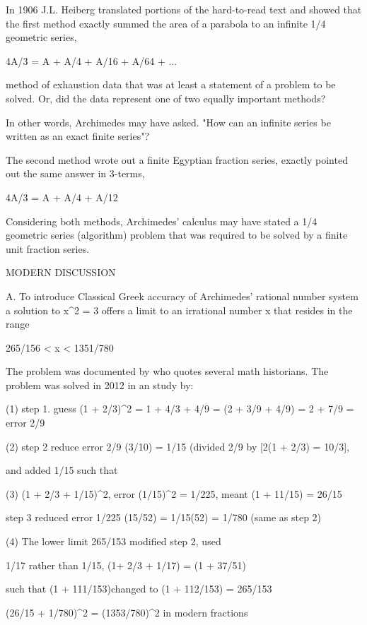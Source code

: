 \documentclass[12pt]{article}
\begin{document}
In 1906 J.L. Heiberg translated portions of the hard-to-read text and showed that the first method exactly summed the area of a parabola to an infinite 1/4 geometric series,

4A/3 = A + A/4 + A/16 + A/64 + ...

method of exhaustion data that was at least a statement of a problem to be solved.  Or, did the data represent one of two equally important methods? 

In other words, Archimedes may have asked. "How can an infinite series be written as an exact finite series"?

The second method wrote out a finite Egyptian fraction series, exactly pointed out the same answer in 3-terms,

4A/3 = A + A/4 + A/12 

Considering both methods, Archimedes' calculus may have stated a 1/4 geometric series (algorithm) problem that was required to be solved by a finite unit fraction series. 

MODERN DISCUSSION

A. To introduce Classical Greek accuracy of Archimedes' rational number system a solution to x^2 = 3 offers a limit to  an irrational number x that resides in the range

265/156 < x < 1351/780

The problem was documented by  who quotes several math historians. The problem was solved in 2012 in an  study by:

(1) step 1. guess (1 + 2/3)^2 = 1 + 4/3 + 4/9 = (2 + 3/9 + 4/9) = 2 + 7/9 = error 2/9

(2) step 2 reduce error 2/9 (3/10) = 1/15 (divided 2/9 by [2(1 + 2/3) = 10/3],

and added 1/15 such that

(3) (1 + 2/3 + 1/15)^2, error (1/15)^2 = 1/225, meant (1 + 11/15) = 26/15

step 3 reduced error 1/225 (15/52) = 1/15(52) = 1/780 (same as step 2)

(4) The lower limit 265/153 modified step 2, used
  
1/17 rather than 1/15, (1+ 2/3 + 1/17) = (1 + 37/51)

such that (1 + 111/153)changed to (1 + 112/153) = 265/153

(26/15 + 1/780)^2 = (1353/780)^2 in modern fractions
\end{document}
